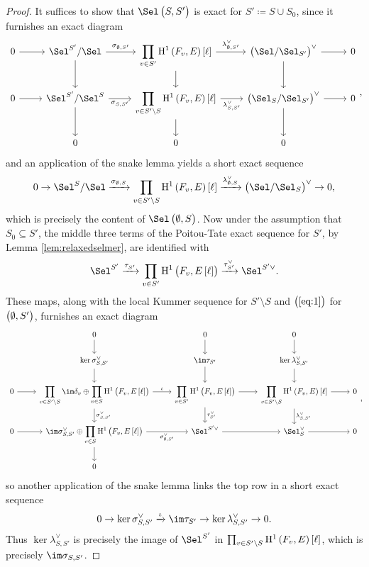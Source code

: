 \begin{proof}
It suffices to show that $ \Sel\br{S, S'} $ is exact for $ S' \coloneqq S \cup S_0 $, since it furnishes an exact diagram
$$
\begin{tikzcd}
0 \arrow{r} & \Sel^{S'} / \Sel \arrow{r}{\sigma_{\emptyset, S'}} \arrow{d} & \displaystyle\prod_{v \in S'} \H^1\br{F_v, E}\sbr{\ell} \arrow{r}{\lambda_{\emptyset, S'}^\vee} \arrow{d} & \br{\Sel / \Sel_{S'}}^\vee \arrow{r} \arrow{d} & 0 \\
0 \arrow{r} & \Sel^{S'} / \Sel^S \arrow{r}[swap]{\sigma_{S, S'}} \arrow{d} & \displaystyle\prod_{v \in S' \setminus S} \H^1\br{F_v, E}\sbr{\ell} \arrow{r}[swap]{\lambda_{S, S'}^\vee} \arrow{d} & \br{\Sel_S / \Sel_{S'}}^\vee \arrow{r} \arrow{d} & 0 \\
& 0 & 0 & 0 &
\end{tikzcd},
$$
and an application of the snake lemma yields a short exact sequence
$$ 0 \to \Sel^S / \Sel \xrightarrow{\sigma_{\emptyset, S}} \prod_{v \in S' \setminus S} \H^1\br{F_v, E}\sbr{\ell} \xrightarrow{\lambda_{\emptyset, S}^\vee} \br{\Sel / \Sel_S}^\vee \to 0, $$
which is precisely the content of $ \Sel\br{\emptyset, S} $. Now under the assumption that $ S_0 \subseteq S' $, the middle three terms of the Poitou-Tate exact sequence for $ S' $, by Lemma \ref{lem:relaxedselmer}, are identified with
$$ \Sel^{S'} \xrightarrow{\tau_{S'}} \prod_{v \in S'} \H^1\br{F_v, E\sbr{\ell}} \xrightarrow{\tau_{S'}^\vee} \Sel^{S'\vee}. $$
These maps, along with the local Kummer sequence for $ S' \setminus S $ and $ \br{\ref{eq:1}} $ for $ \br{\emptyset, S'} $, furnishes an exact diagram
$$
\begin{tikzcd}
& 0 \arrow{d} & 0 \arrow{d} & 0 \arrow{d} & \\
& \ker \sigma_{S, S'}^\vee \arrow{d} & \im \tau_{S'} \arrow{d} & \ker \lambda_{S, S'}^\vee \arrow{d} & \\
0 \arrow{r} & \displaystyle\prod_{v \in S' \setminus S} \im \delta_v \oplus \displaystyle\prod_{v \in S} \H^1\br{F_v, E\sbr{\ell}} \arrow{r}{\iota} \arrow{d}{\sigma_{S, S'}^\vee} & \displaystyle\prod_{v \in S'} \H^1\br{F_v, E\sbr{\ell}} \arrow{r} \arrow{d}{\tau_{S'}^\vee} & \displaystyle\prod_{v \in S' \setminus S} \H^1\br{F_v, E}\sbr{\ell} \arrow{r} \arrow{d}{\lambda_{S, S'}^\vee} & 0 \\
0 \arrow{r} & \im \sigma_{S, S'}^\vee \oplus \displaystyle\prod_{v \in S} \H^1\br{F_v, E\sbr{\ell}} \arrow{r}[swap]{\sigma_{\emptyset, S'}^\vee} \arrow{d} & \Sel^{S'\vee} \arrow{r} & \Sel_S^\vee \arrow{r} & 0 \\
& 0 & & &
\end{tikzcd},
$$
so another application of the snake lemma links the top row in a short exact sequence
$$ 0 \to \ker \sigma_{S, S'}^\vee \xrightarrow{\iota} \im \tau_{S'} \to \ker \lambda_{S, S'}^\vee \to 0. $$
Thus $ \ker \lambda_{S, S'}^\vee $ is precisely the image of $ \Sel^{S'} $ in $ \prod_{v \in S' \setminus S} \H^1\br{F_v, E}\sbr{\ell} $, which is precisely $ \im \sigma_{S, S'} $.
\end{proof}

